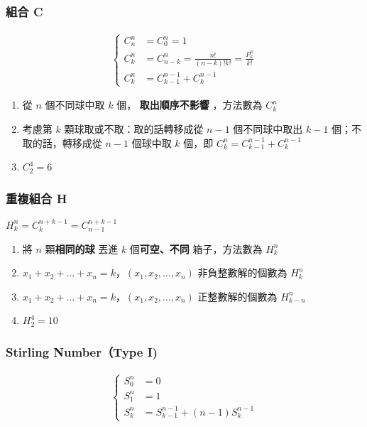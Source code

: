 \documentclass[10pt,oneside]{article}
\begin{document}
\begin{landscape}
\begin{multicols}{2}
\subsubsection{組合 C}

{\normalsize
\begin{equation}
\begin{split}
\begin{cases}
	C^n_n &= C^n_0 = 1 \\
	C^n_k &= C^n_{n-k} = \frac{n!}{(n-k)!k!} = \frac{P^n_k}{k!} \\
	C^n_k &= C^{n-1}_{k-1} + C^{n-1}_{k}
\end{cases}
\end{split}
\end{equation}

\begin{enumerate}
	\item 從 $n$ 個不同球中取 $k$ 個， \textbf{取出順序不影響} ，方法數為 $C^n_k$
	\item 考慮第 $k$ 顆球取或不取：取的話轉移成從 $n-1$ 個不同球中取出 $k-1$ 個；不取的話，轉移成從 $n-1$ 個球中取 $k$ 個，即 $C^n_k = C^{n-1}_{k-1} + C^{n-1}_{k}$
	\item $C^4_2 = 6$
\end{enumerate}
}

\subsubsection{重複組合 H}
{\normalsize
$H^n_k = C^{n+k-1}_k = C^{n+k-1}_{n-1}$

\begin{enumerate}
	\item 將 $n$ 顆\textbf{相同的球} 丟進 $k$ 個\textbf{可空、不同} 箱子，方法數為 $H^n_k$
	\item $x_1 + x_2 + \dots + x_n = k$，$(x_1, x_2, \dots, x_n)$ 非負整數解的個數為 $H^n_k$
	\item $x_1 + x_2 + \dots + x_n = k$，$(x_1, x_2, \dots, x_n)$ 正整數解的個數為 $H^n_{k - n}$
	\item $H^4_2 = 10$
\end{enumerate}
}

\subsubsection{Stirling Number（Type I)}
{\normalsize
\begin{equation}
\begin{split}
\begin{cases}
	S^n_0 &=0 \\
    	S^n_1 &=1 \\
    	S^n_k &= S^{n-1}_{k-1} + (n-1) S^{n-1}_{k}
\end{cases}
\end{split}
\end{equation}

}
\end{multicols}
\end{landscape}
\end{document}
